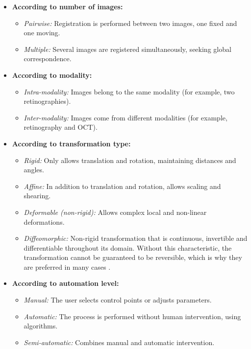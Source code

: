\begin{itemize}
    \item \textbf{According to number of images:}
    \begin{itemize}
        \item \textit{Pairwise:} Registration is performed between two images, one fixed and one moving.
        \item \textit{Multiple:} Several images are registered simultaneously, seeking global correspondence.
    \end{itemize}

    \item \textbf{According to modality:}
    \begin{itemize}
        \item \textit{Intra-modality:} Images belong to the same modality (for example, two retinographies).
        \item \textit{Inter-modality:} Images come from different modalities (for example, retinography and OCT).
    \end{itemize}

    \item \textbf{According to transformation type:}
    \begin{itemize}
        \item \textit{Rigid:} Only allows translation and rotation, maintaining distances and angles.
        \item \textit{Affine:} In addition to translation and rotation, allows scaling and shearing.
        \item \textit{Deformable (non-rigid):} Allows complex local and non-linear deformations.
        \item \textit{Diffeomorphic:} Non-rigid transformation that is continuous, invertible and differentiable throughout its domain. Without this characteristic, the transformation cannot be guaranteed to be reversible, which is why they are preferred in many cases \cite{han2022diffeomorphicimageregistrationneural}.
    \end{itemize}

    \item \textbf{According to automation level:} \cite{deeplernreview3dreg}
    \begin{itemize}
        \item \textit{Manual:} The user selects control points or adjusts parameters.
        \item \textit{Automatic:} The process is performed without human intervention, using algorithms.
        \item \textit{Semi-automatic:} Combines manual and automatic intervention.
    \end{itemize}


\end{itemize}
